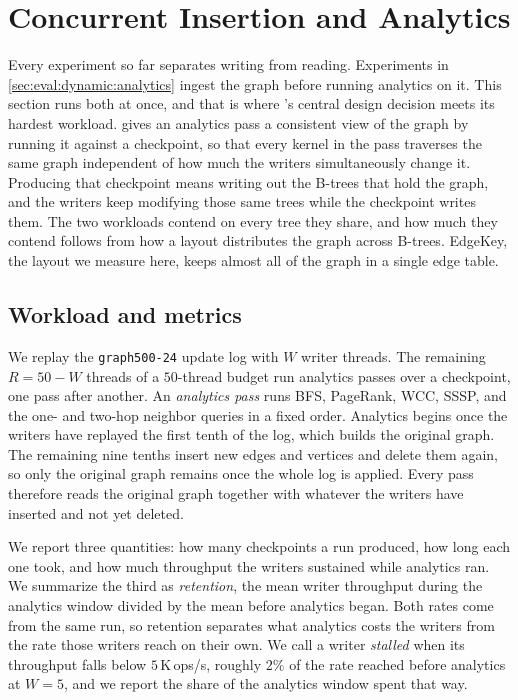 \section{Concurrent Insertion and Analytics}
\label{sec:eval:dynamic:concurrent}

Every experiment so far separates writing from reading.
Experiments in \autoref{sec:eval:dynamic:analytics} ingest the graph before running analytics on it.
This section runs both at once, and that is where \project{}'s central design decision meets its hardest workload.
\project{} gives an analytics pass a consistent view of the graph by running it against a checkpoint, so that every kernel in the pass traverses the same graph independent of how much the writers simultaneously change it.
Producing that checkpoint means writing out the B-trees that hold the graph, and the writers keep modifying those same trees while the checkpoint writes them.
The two workloads contend on every tree they share, and how much they contend follows from how a layout distributes the graph across B-trees.
EdgeKey, the layout we measure here, keeps almost all of the graph in a single edge table.

\subsection{Workload and metrics}
\label{sec:eval:dynamic:concurrent:setup}

We replay the \texttt{graph500-24} update log with $W$ writer threads.
The remaining $R = 50 - W$ threads of a $50$-thread budget run analytics passes over a checkpoint, one pass after another.
An \emph{analytics pass} runs BFS, PageRank, WCC, SSSP, and the one- and two-hop neighbor queries in a fixed order.
Analytics begins once the writers have replayed the first tenth of the log, which builds the original graph.
The remaining nine tenths insert new edges and vertices and delete them again, so only the original graph remains once the whole log is applied.
Every pass therefore reads the original graph together with whatever the writers have inserted and not yet deleted.

We report three quantities: how many checkpoints a run produced, how long each one took, and how much throughput the writers sustained while analytics ran.
We summarize the third as \emph{retention}, the mean writer throughput during the analytics window divided by the mean before analytics began.
Both rates come from the same run, so retention separates what analytics costs the writers from the rate those writers reach on their own.
We call a writer \emph{stalled} when its throughput falls below $5$\,K\,ops/s, roughly $2\%$ of the rate reached before analytics at $W=5$, and we report the share of the analytics window spent that way.

